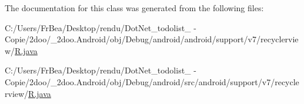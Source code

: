 The documentation for this class was generated from the following files:\begin{CompactItemize}
\item 
C:/Users/FrBea/Desktop/rendu/DotNet\_\-todolist\_ - Copie/2doo/\_\-2doo.Android/obj/Debug/android/android/support/v7/recyclerview/\hyperlink{android_2support_2v7_2recyclerview_2_r_8java}{R.java}\item 
C:/Users/FrBea/Desktop/rendu/DotNet\_\-todolist\_ - Copie/2doo/\_\-2doo.Android/obj/Debug/android/src/android/support/v7/recyclerview/\hyperlink{src_2android_2support_2v7_2recyclerview_2_r_8java}{R.java}\end{CompactItemize}
